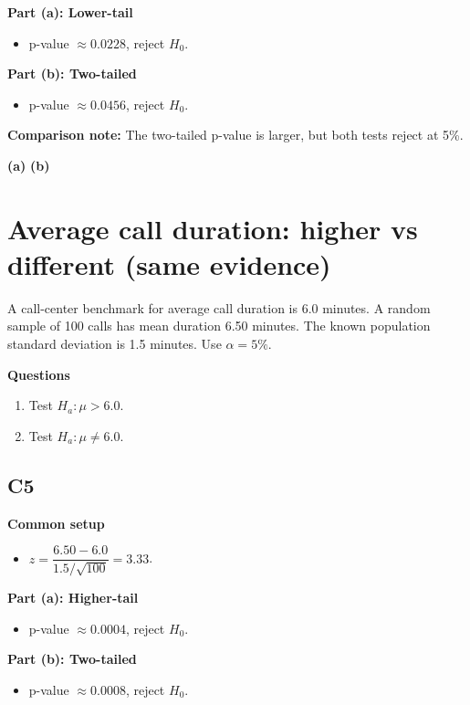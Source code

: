 \textbf{Part (a): Lower-tail}
\begin{itemize}
    \item p-value \(\approx0.0228\), reject \(H_0\).
\end{itemize}

\textbf{Part (b): Two-tailed}
\begin{itemize}
    \item p-value \(\approx0.0456\), reject \(H_0\).
\end{itemize}

\textbf{Comparison note:} The two-tailed p-value is larger, but both tests reject at 5\%.

\begin{center}
\textbf{(a)}\;
\hspace{0.8cm}
\textbf{(b)}\;
\end{center}


\section{Average call duration: higher vs different (same evidence)}
A call-center benchmark for average call duration is 6.0 minutes. A random sample of 100 calls has mean duration 6.50 minutes. The known population standard deviation is 1.5 minutes. Use \(\alpha=5\%\).

\textbf{Questions}
\begin{enumerate}
    \item[(a)] Test \(H_a\colon \mu>6.0\).
    \item[(b)] Test \(H_a\colon \mu\ne6.0\).
\end{enumerate}

\subsection*{C5}
\textbf{Common setup}
\begin{itemize}
    \item \(z=\dfrac{6.50-6.0}{1.5/\sqrt{100}}=3.33\).
\end{itemize}

\textbf{Part (a): Higher-tail}
\begin{itemize}
    \item p-value \(\approx0.0004\), reject \(H_0\).
\end{itemize}

\textbf{Part (b): Two-tailed}
\begin{itemize}
    \item p-value \(\approx0.0008\), reject \(H_0\).
\end{itemize}


